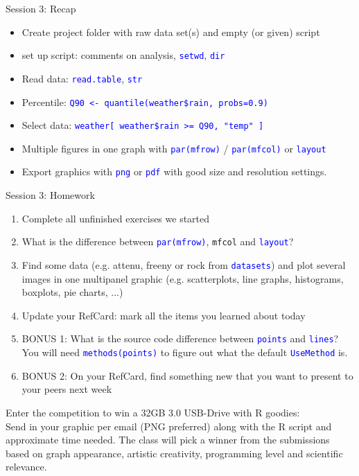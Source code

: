 \documentclass[xcolor=table,       handout,    xcolor=dvipsnames]{beamer}\usepackage[]{graphicx}\usepackage[]{color}
\newcommand{\rcode}[1]{\texttt{\textcolor{Blue}{#1}}} %
\begin{document}
\begin{frame}[fragile]{Session 3: Recap}
\begin{itemize}[<+->]
\item Create project folder with raw data set(s) and empty (or given) script
\item set up script: comments on analysis, \rcode{setwd}, \rcode{dir}
\item Read data: \rcode{read.table}, \rcode{str}
\item Percentile: \rcode{Q90 <- quantile(weather\$rain, probs=0.9)}
\item Select data: \rcode{weather[ weather\$rain >= Q90, "temp" ]}
\item Multiple figures in one graph with \rcode{par(mfrow)} / \rcode{par(mfcol)} or \rcode{layout}
\item Export graphics with \rcode{png} or \rcode{pdf} with good size and resolution settings.
\end{itemize}
\end{frame}


\begin{frame}{Session 3: Homework}
\begin{enumerate}[<+->]
  \item Complete all unfinished exercises we started
  \item What is the difference between \rcode{par(mfrow)}, \texttt{mfcol} and \rcode{layout}?
  \item Find some data (e.g. attenu, freeny or rock from \rcode{datasets}) and plot several images in one multipanel graphic (e.g. scatterplots, line graphs, histograms, boxplots, pie charts, ...)
  \item Update your RefCard: mark all the items you learned about today
  \item BONUS 1: What is the source code difference between \rcode{points} and \rcode{lines}? You will need \rcode{methods(points)} to figure out what the default \rcode{UseMethod} is.
  \item BONUS 2: On your RefCard, find something new that you want to present to your peers next week
\end{enumerate}
\pause
Enter the competition to win a 32GB 3.0 USB-Drive with R goodies:\\
Send in your graphic per email (PNG preferred) along with the R script and approximate time needed.
The class will pick a winner from the submissions based on graph appearance, artistic creativity, programming level and scientific relevance.
\end{frame}
\end{document}
